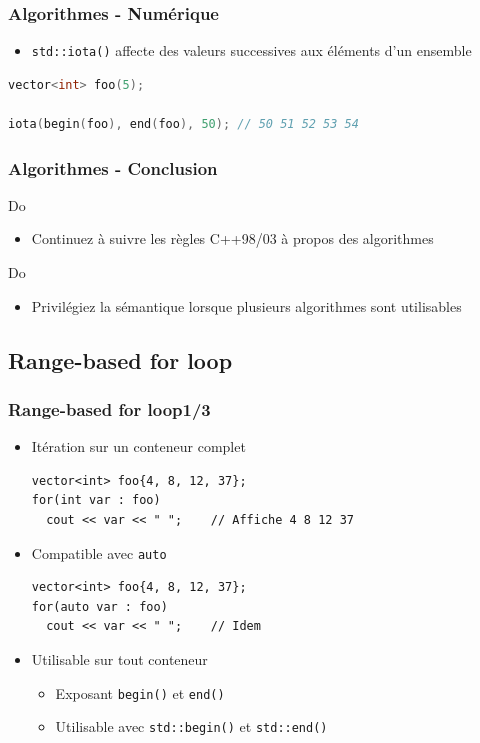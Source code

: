 \documentclass[C++.tex]{subfiles}
\begin{document}
\begin{frame}[fragile]
	\frametitle{Algorithmes - Numérique}
	\begin{itemize}
		\item \lstinline|std::iota()| affecte des valeurs successives aux éléments d'un ensemble
	\end{itemize}

	\begin{lstlisting}[language=C++]
vector<int> foo(5);

iota(begin(foo), end(foo), 50); // 50 51 52 53 54\end{lstlisting}
\end{frame}

\begin{frame}[fragile]
	\frametitle{Algorithmes - Conclusion}
	\begin{exampleblock}{Do}
		\begin{itemize}
			\item Continuez à suivre les règles C++98/03 à propos des algorithmes
		\end{itemize}
	\end{exampleblock}

	\begin{exampleblock}{Do}
		\begin{itemize}
			\item Privilégiez la sémantique lorsque plusieurs algorithmes sont utilisables
		\end{itemize}
	\end{exampleblock}
\end{frame}

\subsection*{Range-based for loop}
\begin{frame}[fragile]
	\frametitle{Range-based for loop\titlehfill{}1/3}
	\begin{itemize}
		\item Itération sur un \og conteneur\fg{} complet

	\begin{lstlisting}
vector<int> foo{4, 8, 12, 37};
for(int var : foo)
  cout << var << " ";    // Affiche 4 8 12 37\end{lstlisting}

		\item Compatible avec \lstinline|auto|

	\begin{lstlisting}
vector<int> foo{4, 8, 12, 37};
for(auto var : foo)
  cout << var << " ";    // Idem\end{lstlisting}

		\item Utilisable sur tout conteneur
		\begin{itemize}
			\item Exposant \lstinline|begin()| et \lstinline|end()|
			\item Utilisable avec \lstinline|std::begin()| et \lstinline|std::end()|
		\end{itemize}
	\end{itemize}
\end{frame}
\end{document}
